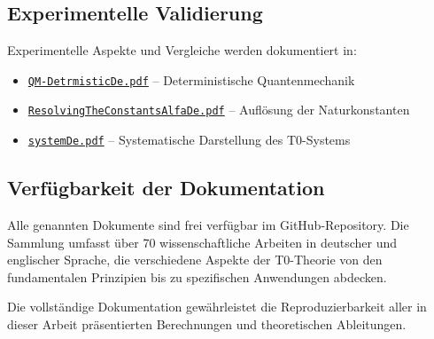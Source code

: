 \documentclass[12pt,a4paper]{article}
\numberwithin{equation}{section}
\begin{document}
	\subsection{Experimentelle Validierung}
	
	Experimentelle Aspekte und Vergleiche werden dokumentiert in:
	
	\begin{itemize}
		\item \href{https://github.com/jpascher/T0-Time-Mass-Duality/blob/main/2/pdf/QM-DetrmisticDe.pdf}{\texttt{QM-DetrmisticDe.pdf}} -- Deterministische Quantenmechanik
		\item \href{https://github.com/jpascher/T0-Time-Mass-Duality/blob/main/2/pdf/ResolvingTheConstantsAlfaDe.pdf}{\texttt{ResolvingTheConstantsAlfaDe.pdf}} -- Auflösung der Naturkonstanten
		\item \href{https://github.com/jpascher/T0-Time-Mass-Duality/blob/main/2/pdf/systemDe.pdf}{\texttt{systemDe.pdf}} -- Systematische Darstellung des T0-Systems
	\end{itemize}
	
	\subsection{Verfügbarkeit der Dokumentation}
	
	Alle genannten Dokumente sind frei verfügbar im GitHub-Repository. Die Sammlung umfasst über 70 wissenschaftliche Arbeiten in deutscher und englischer Sprache, die verschiedene Aspekte der T0-Theorie von den fundamentalen Prinzipien bis zu spezifischen Anwendungen abdecken.
	
	Die vollständige Dokumentation gewährleistet die Reproduzierbarkeit aller in dieser Arbeit präsentierten Berechnungen und theoretischen Ableitungen.
	
\end{document}
